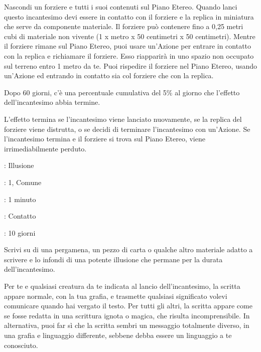 \begin{multicols}{2}
Nascondi un forziere e tutti i suoi contenuti sul Piano Etereo. Quando lanci questo incantesimo devi essere in contatto con il forziere e la replica in miniatura che serve da componente materiale. Il forziere può contenere fino a 0,25 metri cubi di materiale non vivente (1 x metro x 50 centimetri x 50 centimetri). Mentre il forziere rimane sul Piano Etereo, puoi usare un'Azione per entrare in contatto con la replica e richiamare il forziere. Esso riapparirà in uno spazio non occupato sul terreno entro 1 metro da te. Puoi rispedire il forziere nel Piano Etereo, usando un'Azione ed entrando in contatto sia col forziere che con la replica.

Dopo 60 giorni, c'è una percentuale cumulativa del 5\% al giorno che l'effetto dell'incantesimo abbia termine.

L'effetto termina se l'incantesimo viene lanciato nuovamente, se la replica del forziere viene distrutta, o se decidi di terminare l'incantesimo con un'Azione. Se l'incantesimo termina e il forziere si trova sul Piano Etereo, viene irrimediabilmente perduto.

\noindent\colorbox{OBSSgold!10}{
\begin{minipage}{0.95\linewidth}
\begin{description}[noitemsep, topsep=0pt, parsep=0pt, partopsep=0pt, leftmargin=0cm, labelwidth=1.3cm]
	\item[\textbf{Lista}]: Illusione
	\item[\textbf{Livello}]: 1, Comune
	\item[\textbf{Lancio}]: 1 minuto
	\item[\textbf{Gittata}]: Contatto
	\item[\textbf{Durata}]: 10 giorni
\end{description}
\end{minipage}}\smallskip

Scrivi su di una pergamena, un pezzo di carta o qualche altro materiale adatto a scrivere e lo infondi di una potente illusione che permane per la durata dell'incantesimo.

Per te e qualsiasi creatura da te indicata al lancio dell'incantesimo, la scritta appare normale, con la tua grafia, e trasmette qualsiasi significato volevi comunicare quando hai vergato il testo. Per tutti gli altri, la scritta appare come se fosse redatta in una scrittura ignota o magica, che risulta incomprensibile. In alternativa, puoi far sì che la scritta sembri un messaggio totalmente diverso, in una grafia e linguaggio differente, sebbene debba essere un linguaggio a te conosciuto.


\end{multicols}
